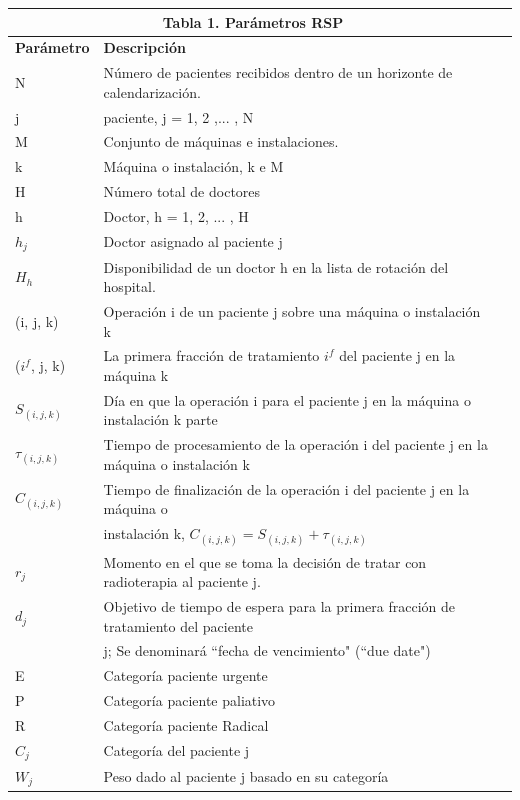 \documentclass[letter, 10pt]{article}
\begin{document}
\begin{tabular}{llr}
\hline
\multicolumn{2}{c}{\textbf{Tabla 1.} Parámetros RSP} \\
\cline{1-2}
\hline
\textbf{Parámetro}    & \textbf{Descripción} \\
\cline{1-2}\hline
N &    Número de pacientes recibidos dentro de un horizonte de calendarización.
\\\hline
j &    paciente, j = 1, 2 ,... , N 
\\\hline
M &    Conjunto de máquinas e instalaciones.
\\\hline
k &    Máquina o instalación, k e M
\\\hline
H &    Número total de doctores
\\\hline
h &    Doctor, h = 1, 2, ... , H
\\\hline
$h_{j}$ &    Doctor asignado al paciente j
\\\hline
$H_{h}$ &    Disponibilidad de un doctor h en la lista de rotación del hospital.  
\\\hline
(i, j, k) &    Operación i de un paciente j sobre una máquina o instalación k
\\\hline
($i^{f}$, j, k) &    La primera fracción de tratamiento $i^{f}$ del paciente j en la máquina k     
\\\hline
$S_{(i,j,k)}$ &    Día en que la operación i para el paciente j en la máquina o instalación k parte    
\\\hline
$\tau_{(i,j,k)}$ &    Tiempo de procesamiento de la operación i del paciente j en la máquina o instalación k   
\\\hline
$C_{(i,j,k)}$ &    Tiempo de finalización de la operación i del paciente j en la máquina o \\& instalación k, $C_{(i,j,k)} = S_{(i,j,k)} + \tau_{(i,j,k)}$   
\\\hline
$r_{j}$ &          Momento en el que se toma la decisión de tratar con radioterapia al paciente j.
\\\hline

$d_{j}$ &          Objetivo de tiempo de espera para la primera fracción de tratamiento del paciente
\\& j; Se denominará ``fecha de vencimiento" (``due date")  
\\\hline

E &          Categoría paciente urgente    
\\\hline
P &          Categoría paciente paliativo
\\\hline
R &          Categoría paciente Radical   
\\\hline
$C_{j}$ &    Categoría del paciente j  
\\\hline
$W_{j}$ &    Peso dado al paciente j basado en su categoría    
\\\hline


\end{tabular}
\end{document}
